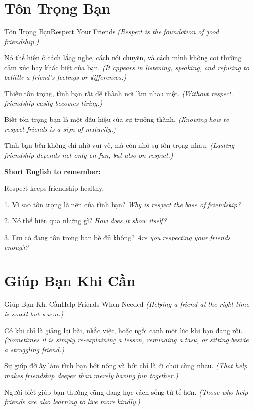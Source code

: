 \section{Tôn Trọng Bạn}
\begin{truyen}{Tôn Trọng Bạn}{Respect Your Friends}
\textit{(Respect is the foundation of good friendship.)}

Nó thể hiện ở cách lắng nghe, cách nói chuyện, và cách mình không coi thường cảm xúc hay khác biệt của bạn.
\textit{(It appears in listening, speaking, and refusing to belittle a friend's feelings or differences.)}

Thiếu tôn trọng, tình bạn rất dễ thành nơi làm nhau mệt.
\textit{(Without respect, friendship easily becomes tiring.)}

Biết tôn trọng bạn là một dấu hiệu của sự trưởng thành.
\textit{(Knowing how to respect friends is a sign of maturity.)}
\end{truyen}

\begin{baihoc}
Tình bạn bền không chỉ nhờ vui vẻ, mà còn nhờ sự tôn trọng nhau.
\textit{(Lasting friendship depends not only on fun, but also on respect.)}
\end{baihoc}

\begin{ghinhoanh}
\textbf{Short English to remember:}

Respect keeps friendship healthy.

\end{ghinhoanh}

\begin{tuhocnhanh}
1. Vì sao tôn trọng là nền của tình bạn? \textit{Why is respect the base of friendship?}

2. Nó thể hiện qua những gì? \textit{How does it show itself?}

3. Em có đang tôn trọng bạn bè đủ không? \textit{Are you respecting your friends enough?}
\end{tuhocnhanh}
\ngancach

\section{Giúp Bạn Khi Cần}
\begin{truyen}{Giúp Bạn Khi Cần}{Help Friends When Needed}
\textit{(Helping a friend at the right time is small but warm.)}

Có khi chỉ là giảng lại bài, nhắc việc, hoặc ngồi cạnh một lúc khi bạn đang rối.
\textit{(Sometimes it is simply re-explaining a lesson, reminding a task, or sitting beside a struggling friend.)}

Sự giúp đỡ ấy làm tình bạn bớt nông và bớt chỉ là đi chơi cùng nhau.
\textit{(That help makes friendship deeper than merely having fun together.)}

Người biết giúp bạn thường cũng đang học cách sống tử tế hơn.
\textit{(Those who help friends are also learning to live more kindly.)}
\end{truyen}

